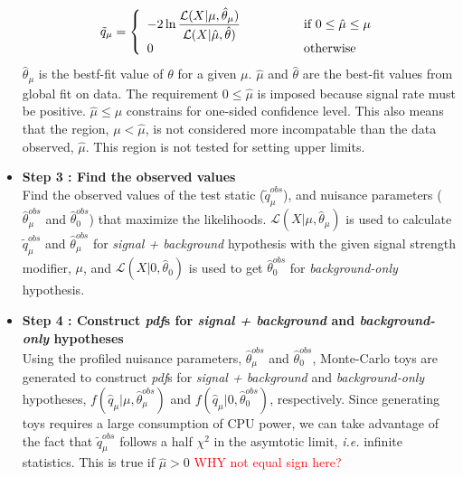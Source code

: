 \begin{itemize}
\begin{eqnarray}
\tilde{q}_\mu 
= 
\left\{ \begin{array}{l l}
\displaystyle
-2 \ln \frac{\mathcal{L} ( X | \mu, \hat{\theta}_\mu)}
            {\mathcal{L} ( X | \hat{\mu}, \hat{\theta})}  
            & \quad \quad \quad \quad \textrm{if } 0 \le \hat{\mu} \le \mu \\
0           & \quad \quad \quad \quad \textrm{otherwise}
\end{array} \right.
\end{eqnarray}  
$\hat{\theta}_\mu$ is the bestf-fit value of $\theta$ for a given $\mu$. 
$\hat{\mu}$ and $\hat{\theta}$ are the best-fit values from global fit on data. 
The requirement $0 \le \hat{\mu}$ is imposed because signal rate must be positive. 
$\hat{\mu} \le \mu$ constrains for one-sided confidence level. 
This also means that the region, $\mu < \hat{\mu}$, is not considered  
more incompatable than the data observed, $\hat{\mu}$. This region 
is not tested for setting upper limits.
%
\item{\textbf{Step 3 : Find the observed values}}  \\
Find the observed values of the test static ($\tilde{q}_\mu^{obs}$), and 
nuisance parameters ($\hat{\theta}_\mu^{obs}$ and $\hat{\theta}_0^{obs}$)
that maximize the likelihoods. 
$\mathcal{L} ( X | \mu, \hat{\theta}_\mu)$ is used to calculate
$\tilde{q}_\mu^{obs}$ and $\hat{\theta}_\mu^{obs}$ for \textit{signal + background}
hypothesis with the given signal strength modifier, $\mu$,
and $\mathcal{L} ( X | 0, \hat{\theta}_0)$ is used to get $\hat{\theta}_0^{obs}$
for \textit{background-only} hypothesis.    
%
\item{\textbf{Step 4 : Construct \textit{pdf}s for \textit{signal + background} 
       and \textit{background-only} hypotheses} } \\
Using the profiled nuisance parameters, $\hat{\theta}_\mu^{obs}$ and $\hat{\theta}_0^{obs}$, 
Monte-Carlo toys are generated to construct \textit{pdf}s for \textit{signal + background}
and \textit{background-only} hypotheses, 
$f\left( \hat{q}_\mu | \mu, \hat{\theta}_\mu^{obs} \right)$ and 
$f\left( \hat{q}_\mu | 0, \hat{\theta}_0^{obs} \right)$, respectively.
Since generating toys requires a large consumption of CPU power, 
we can take advantage of the fact that $\tilde{q}_\mu^{obs}$ follows 
a half $\chi^2$ in the asymtotic limit, \textit{i.e.} infinite statistics.
This is true if $\hat{\mu}>0$ \textcolor{red}{WHY not equal sign here?} 

\end{itemize}
